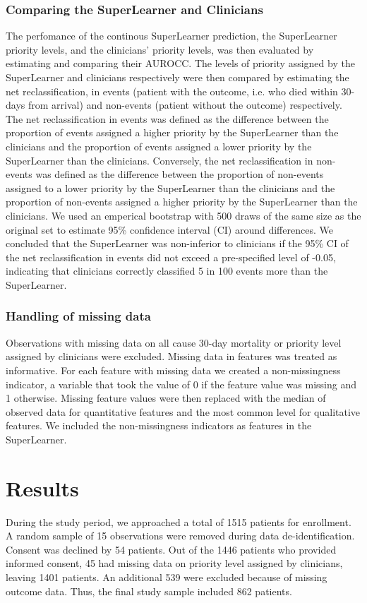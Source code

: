 \documentclass[10pt,letterpaper]{article}\usepackage[]{graphicx}\usepackage[]{color}
\begin{document}
\subsubsection*{Comparing the SuperLearner and Clinicians}
The perfomance of the continous SuperLearner prediction, the SuperLearner
priority levels, and the clinicians' priority levels, was then evaluated by
estimating and comparing their AUROCC. The levels of priority assigned by the
SuperLearner and clinicians respectively were then compared by estimating the
net reclassification, in events (patient with the outcome, i.e. who died within
30-days from arrival) and non-events (patient without the outcome)
respectively. The net reclassification in events was defined as the difference
between the proportion of events assigned a higher priority by the SuperLearner
than the clinicians and the proportion of events assigned a lower priority by
the SuperLearner than the clinicians. Conversely, the net reclassification in
non-events was defined as the difference between the proportion of non-events
assigned to a lower priority by the SuperLearner than the clinicians and the
proportion of non-events assigned a higher priority by the SuperLearner than the
clinicians. We used an emperical bootstrap with 500 draws of the same size as
the original set to estimate 95\% confidence interval (CI) around
differences. We concluded that the SuperLearner was non-inferior to clinicians
if the 95\% CI of the net reclassification in events did not exceed a
pre-specified level of -0.05, indicating that clinicians correctly classified 5
in 100 events more than the SuperLearner.

\subsubsection*{Handling of missing data}
Observations with missing data on all cause 30-day mortality or priority level
assigned by clinicians were excluded. Missing data in features was treated as
informative. For each feature with missing data we created a non-missingness
indicator, a variable that took the value of 0 if the feature value was missing
and 1 otherwise. Missing feature values were then replaced with the median of
observed data for quantitative features and the most common level for
qualitative features. We included the non-missingness indicators as features in
the SuperLearner.

\section*{Results}
During the study period, we approached a total of
1515 patients for enrollment. A random sample of
15 observations were removed during data
de-identification. Consent was declined by 54 patients. Out of the
1446 patients who provided informed consent,
45 had
missing data on priority level assigned by clinicians, leaving
1401 patients. An additional
539
were excluded because of missing outcome data. Thus, the final study sample
included 862 patients.
\end{document}
